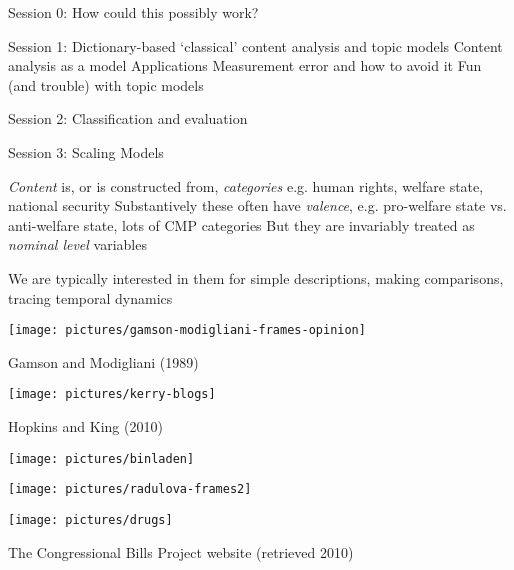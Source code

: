 \documentclass{mediumfoils}
\begin{document}

Session 0: How could this possibly work?

Session 1: Dictionary-based `classical' content analysis and topic models
\ita
\itm Content analysis as a model
\itm Applications
\itm Measurement error and how to avoid it
\itm Fun (and trouble) with topic models
\itz

Session 2: Classification and evaluation

Session 3: Scaling Models

\slide{}



\textsl{Content} is, or is constructed from, \textsl{categories} e.g.
\ita
\itm human rights, welfare state, national security
\itz
Substantively these often have \textsl{valence}, e.g.
\ita
\itm pro-welfare state vs. anti-welfare state, lots of CMP categories
\itz
But they are invariably treated as \textsl{nominal level} variables

We are typically interested in them for
\ita
\itm simple descriptions, making comparisons, tracing temporal dynamics
\itz


\centerline{\texttt{[image: pictures/gamson-modigliani-frames-opinion]}}
Gamson and Modigliani (1989)



\centerline{\texttt{[image: pictures/kerry-blogs]}}
Hopkins and King (2010)


\begin{center}
\texttt{[image: pictures/binladen]}
\end{center}


\centerline{\texttt{[image: pictures/radulova-frames2]}}



\centerline{\texttt{[image: pictures/drugs]}}

The Congressional Bills Project website (retrieved 2010)
%
%
%

%
%
%
%
%
%
\end{document}
